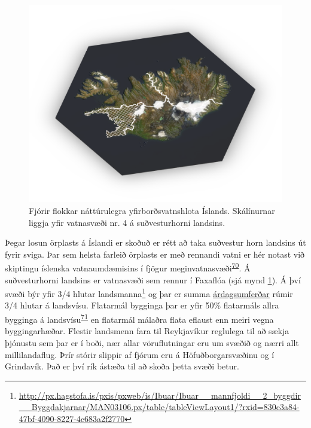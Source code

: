 \documentclass[icelandic,]{book}
\let\rmarkdownfootnote\footnote%
\def\footnote{\protect\rmarkdownfootnote}
\begin{document}
\begin{figure}

{\centering \includegraphics[width=1\linewidth]{myndir/map} 

}

\caption{Fjórir flokkar náttúrulegra yfirborðsvatnshlota Íslands. Skálínurnar liggja yfir vatnasvæði nr. 4 á suðvesturhorni landsins.}\label{fig:vatnasvidsv}
\end{figure}

Þegar losun örplasts á Íslandi er skoðuð er rétt að taka suðvestur horn landsins út fyrir sviga. Þar sem helsta farleið örplasts er með rennandi vatni er hér notast við skiptingu íslenska vatnaumdæmisins í fjögur meginvatnasvæði\textsuperscript{\protect\hyperlink{ref-Bj2012}{70}}. Á suðvesturhorni landsins er vatnasvæði sem rennur í Faxaflóa (sjá mynd \ref{fig:vatnasvidsv}). Á því svæði býr yfir 3/4 hlutar landsmanna\footnote{\url{http://px.hagstofa.is/pxis/pxweb/is/Ibuar/Ibuar__mannfjoldi__2_byggdir__Byggdakjarnar/MAN03106.px/table/tableViewLayout1/?rxid=830c3a84-47bf-4090-8227-4c683a2f2770}} og þar er summa \href{http://www.vegagerdin.is/upplysingar-og-utgafa/umferdin/adferdarfraedi-talninga/}{árdagsumferðar} rúmir 3/4 hlutar á landsvísu. Flatarmál bygginga þar er yfir 50\% flatarmáls allra bygginga á landsvísu\textsuperscript{\protect\hyperlink{ref-OpenStreetMap}{71}} en flatarmál málaðra flata eflaust enn meiri vegna byggingarhæðar. Flestir landsmenn fara til Reykjavíkur reglulega til að sækja þjónustu sem þar er í boði, nær allar vöruflutningar eru um svæðið og nærri allt millilandaflug. Þrír stórir slippir af fjórum eru á Höfuðborgarsvæðinu og í Grindavík. Það er því rík ástæða til að skoða þetta svæði betur.
\end{document}
